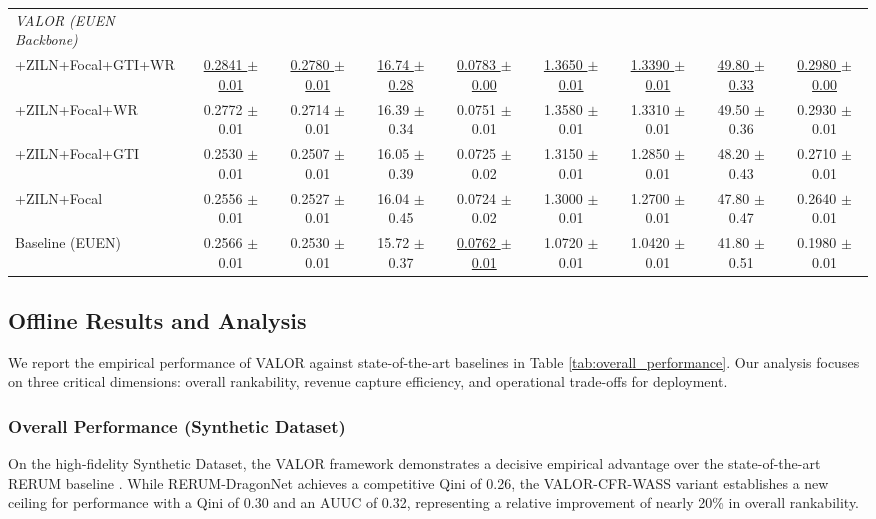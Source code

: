 \documentclass[runningheads]{llncs}
\begin{document}
\begin{table}[t]
{\begin{tabular}{lcccc|cccc}
    \textit{VALOR (EUEN Backbone)} & & & & & & & & \\
    \hspace{3mm}+ZILN+Focal+GTI+WR & \underline{0.2841 $\pm$ 0.01} & \underline{0.2780 $\pm$ 0.01} & \underline{16.74 $\pm$ 0.28} & \underline{0.0783 $\pm$ 0.00} & \underline{1.3650 $\pm$ 0.01} & \underline{1.3390 $\pm$ 0.01} & \underline{49.80 $\pm$ 0.33} & \underline{0.2980 $\pm$ 0.00} \\
    \hspace{3mm}+ZILN+Focal+WR & 0.2772 $\pm$ 0.01 & 0.2714 $\pm$ 0.01 & 16.39 $\pm$ 0.34 & 0.0751 $\pm$ 0.01 & 1.3580 $\pm$ 0.01 & 1.3310 $\pm$ 0.01 & 49.50 $\pm$ 0.36 & 0.2930 $\pm$ 0.01 \\
    \hspace{3mm}+ZILN+Focal+GTI & 0.2530 $\pm$ 0.01 & 0.2507 $\pm$ 0.01 & 16.05 $\pm$ 0.39 & 0.0725 $\pm$ 0.02 & 1.3150 $\pm$ 0.01 & 1.2850 $\pm$ 0.01 & 48.20 $\pm$ 0.43 & 0.2710 $\pm$ 0.01 \\
    \hspace{3mm}+ZILN+Focal & 0.2556 $\pm$ 0.01 & 0.2527 $\pm$ 0.01 & 16.04 $\pm$ 0.45 & 0.0724 $\pm$ 0.02 & 1.3000 $\pm$ 0.01 & 1.2700 $\pm$ 0.01 & 47.80 $\pm$ 0.47 & 0.2640 $\pm$ 0.01 \\
    \hspace{3mm}Baseline (EUEN) & 0.2566 $\pm$ 0.01 & 0.2530 $\pm$ 0.01 & 15.72 $\pm$ 0.37 & \underline{0.0762 $\pm$ 0.01} & 1.0720 $\pm$ 0.01 & 1.0420 $\pm$ 0.01 & 41.80 $\pm$ 0.51 & 0.1980 $\pm$ 0.01 \\
    \bottomrule
  \end{tabular}
  }
\end{table}

\subsection{Offline Results and Analysis}

We report the empirical performance of VALOR against state-of-the-art baselines in Table \ref{tab:overall_performance}. Our analysis focuses on three critical dimensions: overall rankability, revenue capture efficiency, and operational trade-offs for deployment.
\subsubsection{Overall Performance (Synthetic Dataset)}
On the high-fidelity Synthetic Dataset, the VALOR framework demonstrates a decisive empirical advantage over the state-of-the-art RERUM baseline \cite{rerum2024}. While RERUM-DragonNet achieves a competitive Qini of 0.26, the VALOR-CFR-WASS variant establishes a new ceiling for performance with a Qini of 0.30 and an AUUC of 0.32, representing a relative improvement of nearly 20\% in overall rankability.
\end{document}

